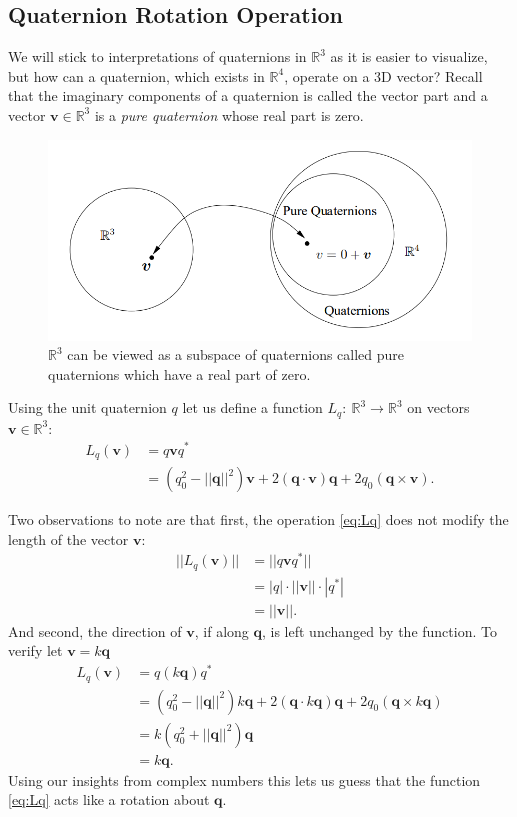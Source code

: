\subsection{Quaternion Rotation Operation}
We will stick to interpretations of quaternions in $\mathbb{R}^3$ as it is easier to visualize, but how can a quaternion, which exists in $\mathbb{R}^4$, operate on a 3D vector?
Recall that the imaginary components of a quaternion is called the vector part and a vector $\textbf{v} \in \mathbb{R}^3$ is a \textit{pure quaternion} whose real part is zero.

\begin{figure}[!h]
	\centering
		\includegraphics[width=1.0\textwidth]{figures/r3.png}
	\caption{$\mathbb{R}^3$ can be viewed as a subspace of quaternions called pure quaternions which have a real part of zero.}
	\label{f:r3}
\end{figure}

Using the unit quaternion $q$ let us define a function $L_q:~\mathbb{R}^3 \rightarrow \mathbb{R}^3$ on vectors $\textbf{v} \in \mathbb{R}^3
$:
\begin{align}
L_q(\textbf{v}) &= q\textbf{v}q^* \nonumber \\
&= (q_0^2 - ||\textbf{q}||^2)\textbf{v} + 2(\textbf{q}\cdot\textbf{v})\textbf{q} + 2q_0(\textbf{q} \times \textbf{v}). 
\label{eq:Lq}
\end{align}

Two observations to note are that first, the operation \eqref{eq:Lq} does not modify the length of the vector $\textbf{v}$:
\begin{align*}
||L_q(\textbf{v})|| &= ||q\textbf{v}q^*||  \\
&= |q| \cdot ||\textbf{v}|| \cdot |q^*| \\
&= ||\textbf{v}||. 
\end{align*}
And second, the direction of $\textbf{v}$, if along $\textbf{q}$, is left unchanged by the function. To verify let $\textbf{v} = k\textbf{q}$
\begin{align*}
L_q(\textbf{v}) &= q(k\textbf{q})q^*  \\
&= (q_0^2 - ||\textbf{q}||^2)k\textbf{q} + 2(\textbf{q}\cdot k\textbf{q})\textbf{q} + 2q_0(\textbf{q} \times k\textbf{q}) \\
&= k(q_0^2 + ||\textbf{q}||^2)\textbf{q} \\
&= k\textbf{q}.
\end{align*}
Using our insights from complex numbers this lets us guess that the function \eqref{eq:Lq} acts like a rotation about $\textbf{q}$.

